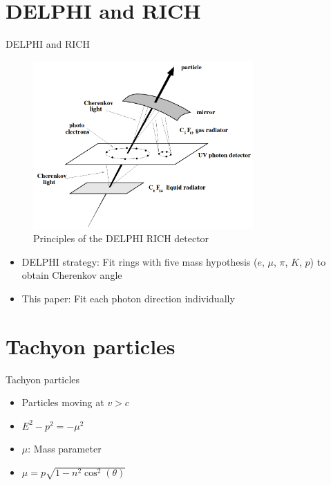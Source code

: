 \documentclass{beamer}
\begin{document}
\section{DELPHI and RICH}
\begin{frame}{DELPHI and RICH}
  \begin{figure}
    \centering
    \includegraphics[width = 0.75\textwidth]{Cherenkov.png}
    \caption{Principles of the DELPHI RICH detector}
  \end{figure}
  \begin{itemize}
    \item{DELPHI strategy: Fit rings with five mass hypothesis ($e$, $\mu$, $\pi$, $K$, $p$) to obtain Cherenkov angle}
    \item{This paper: Fit each photon direction individually}
  \end{itemize}
\end{frame}

\section{Tachyon particles}
\begin{frame}{Tachyon particles}
  \begin{itemize}
    \item{Particles moving at $v > c$}
    \item{$E^2 - p^2 = -\mu^2$}
    \item{$\mu$: Mass parameter}
    \item{$\mu = p\sqrt{1 - n^2\cos^2(\theta)}$}
  \end{itemize}
\end{frame}
\end{document}
